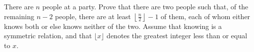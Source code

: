 There are $n$ people at a party. Prove that there are two people such that, of the remaining $n-2$ people, there are at least $\left\lfloor\frac{n}{2}\right\rfloor-1$ of them, each of whom either knows both or else knows neither of the two. Assume that knowing is a symmetric relation, and that $\lfloor x\rfloor$ denotes the greatest integer less than or equal to $x$.